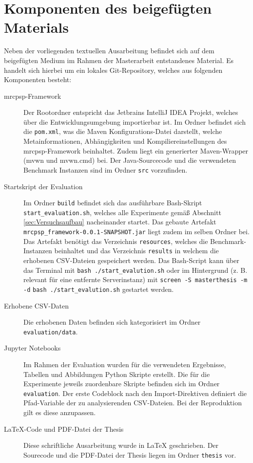 \chapter{Komponenten des beigefügten Materials}
\label{ch:Anhang}

Neben der vorliegenden textuellen Ausarbeitung befindet sich auf dem beigefügten Medium im Rahmen der Masterarbeit entstandenes Material. Es handelt sich hierbei um ein lokales Git-Repository, welches aus folgenden Komponenten besteht:

\begin{description}
\item[\ac{mrcpsp}-Framework] Der Rootordner entspricht das Jetbrains IntelliJ IDEA Projekt, welches über die Entwicklungsumgebung importierbar ist. Im Ordner befindet sich die \lstinline|pom.xml|, was die Maven Konfigurations-Datei darstellt, welche Metainformationen, Abhängigkeiten und Kompiliereinstellungen des \ac{mrcpsp}-Framework beinhaltet. Zudem liegt ein generierter Maven-Wrapper (mvwn und mvwn.cmd) bei. Der Java-Sourcecode und die verwendeten Benchmark Instanzen sind im Ordner \lstinline|src| vorzufinden. 

\item[Startskript der Evaluation] Im Ordner \lstinline|build| befindet sich das ausführbare Bash-Skript \lstinline|start_evaluation.sh|, welches alle Experimente gemäß Abschnitt \ref{sec:Versuchsaufbau} nacheinander startet. Das gebaute Artefakt \lstinline|mrcpsp_framework-0.0.1-SNAPSHOT.jar| liegt zudem im selben Ordner bei. Das Artefakt benötigt das Verzeichnis \lstinline|resources|, welches die Benchmark-Instanzen beinhaltet und das Verzeichnis \lstinline|results| in welchem die erhobenen CSV-Dateien gespeichert werden. Das Bash-Script kann über das Terminal mit \lstinline|bash ./start_evalution.sh| oder im Hintergrund (z. B. relevant für eine entfernte Serverinstanz) mit \lstinline|screen -S masterthesis -m -d| \lstinline|bash ./start_evalution.sh| gestartet werden.

\item[Erhobene CSV-Daten] Die erhobenen Daten befinden sich kategorisiert im Ordner \lstinline|evaluation/data|. 

\item[Jupyter Notebooks] Im Rahmen der Evaluation wurden für die verwendeten Ergebnisse, Tabellen und Abbildungen Python Skripte erstellt. Die für die Experimente jeweils zuordenbare Skripte befinden sich im Ordner \lstinline|evaluation|. Der erste Codeblock nach den Import-Direktiven definiert die Pfad-Variable der zu analysierenden CSV-Dateien. Bei der Reproduktion gilt es diese anzupassen. 

\item[\LaTeX-Code und PDF-Datei der Thesis] Diese schriftliche Ausarbeitung wurde in \LaTeX{} geschrieben. Der Sourecode und die PDF-Datei der Thesis liegen im Ordner \lstinline|thesis| vor.

\end{description}

